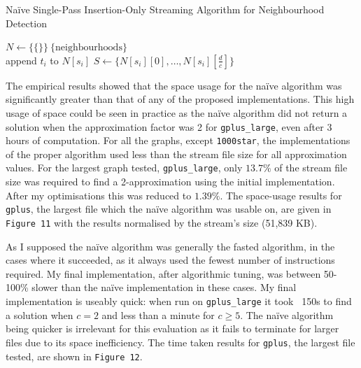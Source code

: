 \documentclass[11pt,twoside,a4paper]{report}
\begin{document}
\begin{algorithm}
	\caption{Na\"ive Single-Pass Insertion-Only Streaming Algorithm for Neighbourhood Detection}
	$N\leftarrow\{\{\}\}\ \{\text{neighbourhoods}\}$\\
	 {
		append $t_i$ to $N[s_i]$
		 {
			$S\leftarrow \{N[s_i][0],\dots,N[s_i][\frac{d}{c}]\}$
		}
	}
\end{algorithm}


\par The empirical results showed that the space usage for the naïve algorithm was significantly greater than that of any of the proposed implementations. This high usage of space could be seen in practice as the naïve algorithm did not return a solution when the approximation factor was 2 for \texttt{gplus\_large}, even after 3 hours of computation. For all the graphs, except \texttt{1000star}, the implementations of the proper algorithm used less than the stream file size for all approximation values. For the largest graph tested, \texttt{gplus\_large}, only $13.7\%$ of the stream file size was required to find a 2-approximation using the initial implementation. After my optimisations this was reduced to $1.39\%$. The space-usage results for \texttt{gplus}, the largest file which the naïve algorithm was usable on, are given in \texttt{Figure 11} with the results normalised by the stream's size (51,839 KB).


\par As I supposed the naïve algorithm was generally the fasted algorithm, in the cases where it succeeded, as it always used the fewest number of instructions required. My final implementation, after algorithmic tuning, was between 50-100\% slower than the naïve implementation in these cases. My final implementation is useably quick: when run on \texttt{gplus\_large} it took ~150s to find a solution when $c=2$ and less than a minute for $c\geq5$. The naïve algorithm being quicker is irrelevant for this evaluation as it fails to terminate for larger files due to its space inefficiency. The time taken results for \texttt{gplus}, the largest file tested, are shown in \texttt{Figure 12}.
\end{document}
